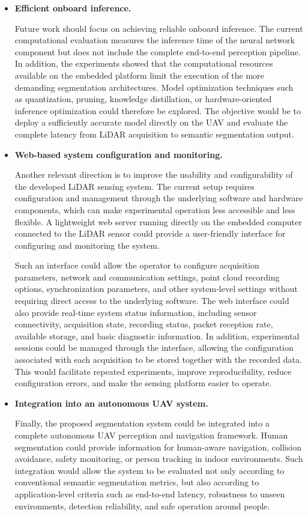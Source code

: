 \begin{itemize}
\item \textbf{Efficient onboard inference.}

Future work should focus on achieving reliable onboard inference. The current computational evaluation measures the inference time of the neural network component but does not include the complete end-to-end perception pipeline. In addition, the experiments showed that the computational resources available on the embedded platform limit the execution of the more demanding segmentation architectures. Model optimization techniques such as quantization, pruning, knowledge distillation, or hardware-oriented inference optimization could therefore be explored. The objective would be to deploy a sufficiently accurate model directly on the UAV and evaluate the complete latency from LiDAR acquisition to semantic segmentation output.

\item \textbf{Web-based system configuration and monitoring.}

Another relevant direction is to improve the usability and configurability of the developed LiDAR sensing system. The current setup requires configuration and management through the underlying software and hardware components, which can make experimental operation less accessible and less flexible. A lightweight web server running directly on the embedded computer connected to the LiDAR sensor could provide a user-friendly interface for configuring and monitoring the system.

Such an interface could allow the operator to configure acquisition parameters, network and communication settings, point cloud recording options, synchronization parameters, and other system-level settings without requiring direct access to the underlying software. The web interface could also provide real-time system status information, including sensor connectivity, acquisition state, recording status, packet reception rate, available storage, and basic diagnostic information. In addition, experimental sessions could be managed through the interface, allowing the configuration associated with each acquisition to be stored together with the recorded data. This would facilitate repeated experiments, improve reproducibility, reduce configuration errors, and make the sensing platform easier to operate.

\item \textbf{Integration into an autonomous UAV system.}

Finally, the proposed segmentation system could be integrated into a complete autonomous UAV perception and navigation framework. Human segmentation could provide information for human-aware navigation, collision avoidance, safety monitoring, or person tracking in indoor environments. Such integration would allow the system to be evaluated not only according to conventional semantic segmentation metrics, but also according to application-level criteria such as end-to-end latency, robustness to unseen environments, detection reliability, and safe operation around people.


\end{itemize}

